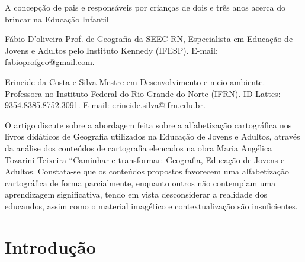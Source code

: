 \begin{refsection}
    \renewcommand{\thefigure}{\arabic{figure}}
    \renewcommand{\thetable}{\arabic{table}}
    
    \chapterOneLine
    {A concepção de pais e responsáveis por crianças de dois e três anos acerca do brincar na Educação Infantil}
    \label{chap:alfabetizacao-cartog}

    \articleAuthor
    {Fábio D'oliveira}
    {Prof. de Geografia da SEEC-RN, Especialista em Educação de Jovens e Adultos pelo Instituto Kennedy (IFESP). E-mail: fabioprofgeo@gmail.com.}
    
    \articleAuthor
    {Erineide da Costa e Silva}
    {Mestre em Desenvolvimento e meio ambiente. Professora no Instituto Federal do Rio Grande do Norte (IFRN). ID Lattes: 9354.8385.8752.3091. E-mail: erineide.silva@ifrn.edu.br.}
    
    \begin{galoResumo}
        O artigo discute sobre a abordagem feita sobre a alfabetização cartográfica nos livros didáticos de Geografia utilizados na Educação de Jovens e Adultos, através da análise dos conteúdos de cartografia elencados na obra Maria Angélica Tozarini Teixeira “Caminhar e transformar: Geografia, Educação de Jovens e Adultos. Constata-se que os conteúdos propostos favorecem uma alfabetização cartográfica de forma parcialmente, enquanto outros não contemplam uma aprendizagem significativa, tendo em vista desconsiderar a realidade dos educandos, assim como o material imagético e contextualização são insuficientes. 
    \end{galoResumo}
    



    \section{Introdução}


\end{refsection}
